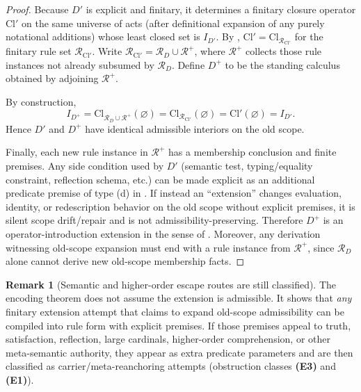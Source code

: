 \documentclass[11pt]{article}
\theoremstyle{definition}
\newtheorem{remark}[theorem]{Remark}
\begin{document}
\begin{proof}
Because $D'$ is explicit and finitary, it determines a finitary closure operator $\mathrm{Cl}'$ on the same universe of acts (after definitional expansion of any purely notational additions) whose least closed set is $I_{D'}$.
By , $\mathrm{Cl}'=\mathrm{Cl}_{\mathcal{R}_{\mathrm{Cl}'}}$ for the finitary rule set $\mathcal{R}_{\mathrm{Cl}'}$.
Write $\mathcal{R}_{\mathrm{Cl}'}=\mathcal{R}_D\cup \mathcal{R}^+$, where $\mathcal{R}^+$ collects those rule instances not already subsumed by $\mathcal{R}_D$.
Define $D^+$ to be the standing calculus obtained by adjoining $\mathcal{R}^+$.

By construction,
\[
I_{D^+}=\mathrm{Cl}_{\mathcal{R}_D\cup \mathcal{R}^+}(\varnothing)=\mathrm{Cl}_{\mathcal{R}_{\mathrm{Cl}'}}(\varnothing)=\mathrm{Cl}'(\varnothing)=I_{D'}.
\]
Hence $D'$ and $D^+$ have identical admissible interiors on the old scope.

Finally, each new rule instance in $\mathcal{R}^+$ has a membership conclusion and finite premises.
Any side condition used by $D'$ (semantic test, typing/equality constraint, reflection schema, etc.) can be made explicit as an additional predicate premise of type (d) in .
If instead an ``extension'' changes evaluation, identity, or redescription behavior on the old scope without explicit premises, it is silent scope drift/repair and is not admissibility-preserving.
Therefore $D^+$ is an operator-introduction extension in the sense of .
Moreover, any derivation witnessing old-scope expansion must end with a rule instance from $\mathcal{R}^+$, since $\mathcal{R}_D$ alone cannot derive new old-scope membership facts.
\end{proof}

\begin{remark}[Semantic and higher-order escape routes are still classified]
The encoding theorem does not assume the extension is admissible.
It shows that \emph{any} finitary extension attempt that claims to expand old-scope admissibility can be compiled into rule form with explicit premises.
If those premises appeal to truth, satisfaction, reflection, large cardinals, higher-order comprehension, or other meta-semantic authority, they appear as extra predicate parameters and are then classified as carrier/meta-reanchoring attempts (obstruction classes \textbf{(E3)} and \textbf{(E1)}).
\end{remark}
\end{document}
